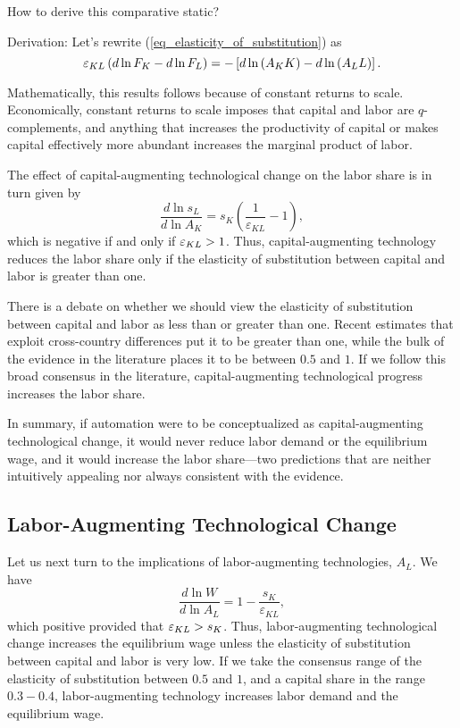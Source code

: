 \documentclass[12pt]{article}
\theoremstyle{definition}
\begin{document}
{\color{MyPink}

How to derive this comparative static?

Derivation: Let's rewrite (\ref{eq_elasticity_of_substitution}) as 
$$
\ve_{KL} \bp{d \ln F_K - d \ln F_L} = - \bs{d \ln\of{A_K K} - d \ln\of{A_L L}}.
$$

}

Mathematically, this results follows because of constant returns to scale. Economically, constant returns to scale imposes that capital and labor are $q$-complements, and anything that increases the productivity of capital or makes capital effectively more abundant increases the marginal product of labor. 

The effect of capital-augmenting technological change on the labor share is in turn given by 
\begin{equation}
    \label{eq_catc_labor_share}
    \frac{d \ln s_L}{d \ln A_K}=s_K\left(\frac{1}{\varepsilon_{K L}}-1\right),
\end{equation}
which is negative if and only if $\varepsilon_{KL} > 1$. Thus, capital-augmenting technology reduces the labor share only if the elasticity of substitution between capital and labor is greater than one.

There is a debate on whether we should view the elasticity of substitution between capital and labor as less than or greater than one. Recent estimates that exploit cross-country differences put it to be greater than one, while the bulk of the evidence in the literature places it to be between $0.5$ and $1$. If we follow this broad consensus in the literature, capital-augmenting technological progress increases the labor share.

In summary, if automation were to be conceptualized as capital-augmenting technological change, it would never reduce labor demand or the equilibrium wage, and it would increase the labor share—two predictions that are neither intuitively appealing nor always consistent with the evidence.

\subsection{Labor-Augmenting Technological Change}

Let us next turn to the implications of labor-augmenting technologies, $A_L$. We have 
\begin{equation}
    \label{latc}
    \frac{d \ln W}{d \ln A_L}=1-\frac{s_K}{\varepsilon_{K L}},
\end{equation}
which positive provided that $\varepsilon_{KL} > s_K$. Thus, labor-augmenting technological change increases the equilibrium wage unless the elasticity of substitution between capital and labor is very low. If we take the consensus range of the elasticity of substitution between $0.5$ and $1$, and a capital share in the range $0.3-0.4$, labor-augmenting technology increases labor demand and the equilibrium wage.
\end{document}
